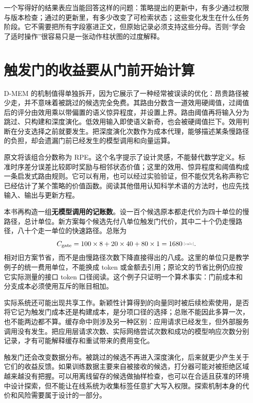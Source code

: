 一个写得好的结果表应当能回答这样的问题：策略提出的更新中，有多少通过权限与版本检查；通过的更新里，有多少改变了可检索状态；这些变化发生在什么任务阶段。它不需要把所有字段塞进正文，但原始记录必须支持这些分母。否则“学会了适时操作”很容易只是一张动作柱状图的过度解释。

\section{触发门的收益要从门前开始计算}
\label{sec:ch06-gate-cost}

D-MEM 的机制值得单独拆开，因为它展示了一种经常被误读的优化：昂贵路径被少走，并不意味着被跳过的候选完全免费。其路由分数含一道效用硬阈值，过阈值后的评分由效用乘以带偏置的语义惊异程度，并设置上界。路由阈值再将输入分为跳过、只构建和深度演化\cite{dmem-2603}。低效用输入即使语义新奇，也会被硬阈值拦下。效用判断在分支选择之前就要发生。把深度演化次数作为成本代理，能够描述某条慢路径的负担，却会遗漏门前已经发生的模型调用和向量运算。

原文将该组合分数称为 RPE。这个名字提示了设计灵感，不能替代数学定义。标准时序差分误差比较即时奖励与相邻状态价值；这里的效用、惊异程度和阈值构成一条启发式路由规则。它可以有用，也可以经过实验验证，但不能仅凭名称声称它已经估计了某个策略的价值函数。阅读其他借用认知科学术语的方法时，也应先找输入、输出与更新方程。

本书再构造一组\textbf{无模型调用的记账数}。设一百个候选原本都走代价为四十单位的慢路径，总计单位。新方案每个候选先付八单位触发门代价，其中二十个仍走慢路径，八十个走一单位的快速路径。总账为
\begin{equation}
C_{\rm gate}=100\times8+20\times40+80\times1
=\calcnum{1680}.
\end{equation}
相对旧方案节省，而不是由慢路径次数下降直接得出的八成。这里的单位只是教学例子的统一费用单位，不能换成 token 或金额去引用；原论文的节省比例仍应按它实际测量的接口 token 口径阅读。这个例子只证明一个算术事实：门前成本和分支成本必须使用互斥的账目相加。

实际系统还可能出现共享工作。新颖性计算得到的向量同时被后续检索使用，是否将它记为触发门成本还是构建成本，是分项口径的选择；总账不能因此多算一次，也不能两边都不算。缓存命中则涉及另一种区别：应用请求已经发生，但外部服务调用没有发生。把应用层请求次数、实际网络尝试次数和成功的模型响应次数分别记录，才有可能解释缓存和重试带来的费用变化。

触发门还会改变数据分布。被跳过的候选不再进入深度演化，后来就更少产生关于它们的收益反馈。如果训练数据主要来自被接收的候选，打分器可能对被拒绝区域越来越没有把握。可以用离线留存的候选做抽样检查，也可以在合适且获准的环境中设计探索，但不能让在线系统为收集标签任意扩大写入权限。探索机制本身的代价和风险需要属于设计的一部分。

